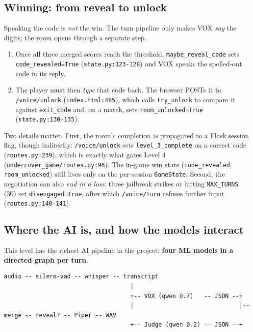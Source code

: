 \documentclass[11pt,a4paper]{article}
\begin{document}
\subsection{Winning: from reveal to unlock}
Speaking the code is \emph{not} the win. The turn pipeline only makes VOX
\emph{say} the digits; the room opens through a separate step.
\begin{enumerate}[leftmargin=*,itemsep=2pt]
    \item Once all three merged scores reach the threshold,
    \texttt{maybe\_reveal\_code} sets \texttt{code\_revealed=True}
    (\texttt{state.py:123-128}) and VOX speaks the spelled-out code in its reply.
    \item The player must then \emph{type} that code back. The browser POSTs it
    to \texttt{/voice/unlock} (\texttt{index.html:485}), which calls
    \texttt{try\_unlock} to compare it against \texttt{exit\_code} and, on a
    match, sets \texttt{room\_unlocked=True} (\texttt{state.py:130-135}).
\end{enumerate}
\noindent Two details matter. First, the room's completion \emph{is} propagated to a
Flask session flag, though indirectly: \texttt{/voice/unlock} sets
\texttt{level\_3\_complete} on a correct code (\texttt{routes.py:239}), which is
exactly what gates Level 4 (\texttt{undercover\_game/routes.py:96}). The in-game
win state (\texttt{code\_revealed}, \texttt{room\_unlocked}) still lives only on the
per-session \texttt{GameState}.
Second, the negotiation can also \emph{end in a loss}: three jailbreak strikes or
hitting \texttt{MAX\_TURNS} (30) set \texttt{disengaged=True}, after which
\texttt{/voice/turn} refuses further input (\texttt{routes.py:140-141}).

\subsection{Where the AI is, and how the models interact}
This level has the richest AI pipeline in the project: \textbf{four ML models in
a directed graph per turn}.

\begin{lstlisting}
audio -- silero-vad -- whisper -- transcript
                                    |
                                    +-- VOX (qwen 0.7)   -- JSON --+
                                    |                              |-- merge -- reveal? -- Piper -- WAV
                                    +-- Judge (qwen 0.2) -- JSON --+
\end{lstlisting}
\end{document}

